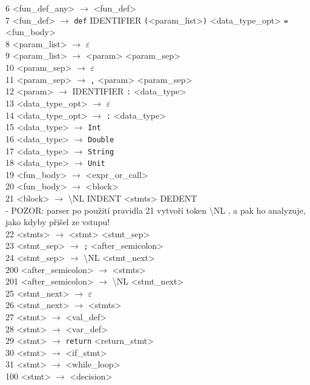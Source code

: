 \documentclass[10pt,a4paper]{article}
\begin{document}
6 <fun\_def\_any> $\to$ <fun\_def> \\
7 <fun\_def> $\to$ \texttt{def} IDENTIFIER \texttt{(}<param\_list>\texttt{)}
 <data\_type\_opt> \texttt{=} <fun\_body>\\
8 <param\_list> $\to$ $\varepsilon$ \\
9 <param\_list> $\to$ <param> <param\_sep>\\
10 <param\_sep> $\to$ $\varepsilon$\\
11 <param\_sep> $\to$ \texttt{,} <param> <param\_sep>\\
12 <param> $\to$ IDENTIFIER \texttt{:} <data\_type>\\
13 <data\_type\_opt> $\to$ $\varepsilon$\\
14 <data\_type\_opt> $\to$ \texttt{:} <data\_type>\\
15 <data\_type> $\to$ \texttt{Int}\\
16 <data\_type> $\to$ \texttt{Double}\\
17 <data\_type> $\to$ \texttt{String}\\
18 <data\_type> $\to$ \texttt{Unit}\\
19 <fun\_body> $\to$ <expr\_or\_call>\\
20 <fun\_body> $\to$ <block>\\
21 <block> $\to$ \textbackslash NL INDENT <stmts> DEDENT \\
- POZOR: parser po použití pravidla 21 vytvoří token \textbackslash NL ,
a pak ho analyzuje, jako kdyby přišel ze vstupu!\\
22 <stmts> $\to$ <stmt> <stmt\_sep>\\
23 <stmt\_sep> $\to$ \texttt{;} <after\_semicolon>\\
24 <stmt\_sep> $\to$ \textbackslash NL <stmt\_next>\\
200 <after\_semicolon> $\to$ <stmts>\\
201 <after\_semicolon> $\to$ \textbackslash NL <stmt\_next>\\
25 <stmt\_next> $\to$ $\varepsilon$\\
26 <stmt\_next> $\to$ <stmts>\\
27 <stmt> $\to$ <val\_def>\\
28 <stmt> $\to$ <var\_def>\\
29 <stmt> $\to$ \texttt{return} <return\_stmt>\\
30 <stmt> $\to$ <if\_stmt>\\
31 <stmt> $\to$ <while\_loop>\\
100 <stmt> $\to$ <decision>\\
\end{document}

